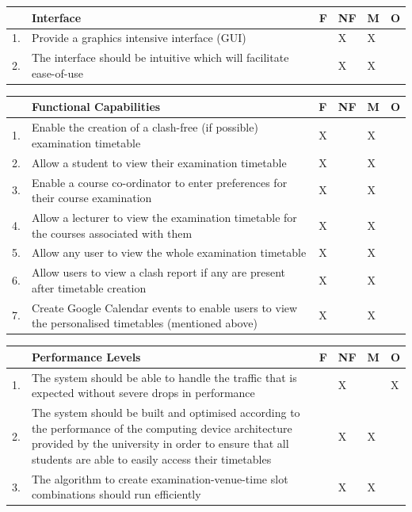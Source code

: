 \documentclass{article}
\begin{document}
\begin{center}
\begin{tabular}{|m{1cm}|m{10cm}|m{1cm}|m{1cm}|m{1cm}|m{1cm}|}
\hline
 & \textbf{Interface} & \textbf{F} & \textbf{NF} & \textbf{M} & \textbf{O} \\
\hline
1. & {Provide a graphics intensive interface (GUI)} & & X & X & \\
\hline
2. & {The interface should be intuitive which will facilitate ease-of-use} & & X & X & \\

\hline
\end{tabular}
\end{center}

\begin{center}
\begin{tabular}{|m{1cm}|m{10cm}|m{1cm}|m{1cm}|m{1cm}|m{1cm}|}
\hline
 & \textbf{Functional Capabilities} & \textbf{F} & \textbf{NF} & \textbf{M} & \textbf{O} \\
\hline
1. & {Enable the creation of a clash-free (if possible) examination timetable} & X & & X & \\
\hline
2. & {Allow a student to view their examination timetable} & X & & X & \\
\hline
3. & {Enable a course co-ordinator to enter preferences for their course examination} & X & & X & \\
\hline
4. & {Allow a lecturer to view the examination timetable for the courses associated with them} & X & & X & \\
\hline
5. & {Allow any user to view the whole examination timetable} & X & & X & \\
\hline
6. & {Allow users to view a clash report if any are present after timetable creation} & X & & X & \\
\hline
7. & {Create Google Calendar events to enable users to view the personalised timetables (mentioned above)} & X & & X & \\
\hline
\end{tabular}
\end{center}

\begin{center}
\begin{tabular}{|m{1cm}|m{10cm}|m{1cm}|m{1cm}|m{1cm}|m{1cm}|} 
\hline
 & \textbf{Performance Levels} & \textbf{F} & \textbf{NF} & \textbf{M} & \textbf{O} \\
\hline
1. & {The system should be able to handle the traffic that is expected without severe drops in performance} & & X & & X\\
\hline
2. & {The system should be built and optimised according to the performance of the computing device architecture provided by the university in order to ensure that all students are able to easily access their timetables} & & X & X & \\
\hline
3. & {The algorithm to create examination-venue-time slot combinations should run efficiently} & & X & X & \\
\hline
\end{tabular}
\end{center}
\end{document}
